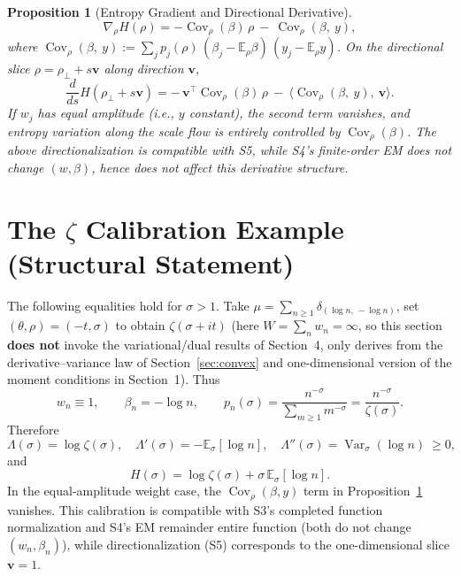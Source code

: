 \documentclass[11pt,a4paper]{article}
\newtheorem{proposition}[theorem]{Proposition}
\theoremstyle{remark}
\DeclareMathOperator{\Var}{Var}
\DeclareMathOperator{\Cov}{Cov}
\begin{document}
\begin{proposition}[Entropy Gradient and Directional Derivative]\label{prop:entropy_grad}
\begin{equation}
\nabla_\rho H(\rho)= -\Cov_\rho(\beta)\,\rho\ -\ \Cov_\rho(\beta,\ y),
\end{equation}
where $\Cov_\rho(\beta,\ y):=\sum_j p_j(\rho)\,(\beta_j-\mathbb{E}_\rho\beta)\,(y_j-\mathbb{E}_\rho y)$. On the directional slice $\rho=\rho_\perp+s\mathbf{v}$ along direction $\mathbf{v}$,
\begin{equation}
\frac{d}{ds}H(\rho_\perp+s\mathbf{v})= -\,\mathbf{v}^\top\Cov_\rho(\beta)\,\rho\ -\ \big\langle \Cov_\rho(\beta,\ y),\ \mathbf{v}\big\rangle.
\end{equation}
If $w_j$ has equal amplitude (i.e., $y$ constant), the second term vanishes, and entropy variation along the scale flow is entirely controlled by $\Cov_\rho(\beta)$. The above directionalization is compatible with S5, while S4's finite-order EM does not change $(w,\beta)$, hence does not affect this derivative structure.
\end{proposition}

\section{The $\zeta$ Calibration Example (Structural Statement)}

The following equalities hold for $\sigma>1$. Take $\mu=\sum_{n\ge 1}\delta_{(\log n,\,-\log n)}$, set $(\theta,\rho)=(-t,\sigma)$ to obtain $\zeta(\sigma+it)$ (here $W=\sum_n w_n=\infty$, so this section \textbf{does not} invoke the variational/dual results of Section~4, only derives from the derivative--variance law of Section~\ref{sec:convex} and one-dimensional version of the moment conditions in Section~1). Thus
\begin{equation}
w_n\equiv 1,\qquad \beta_n=-\log n,\qquad
p_n(\sigma)=\frac{n^{-\sigma}}{\sum_{m\ge 1} m^{-\sigma}}=\frac{n^{-\sigma}}{\zeta(\sigma)}.
\end{equation}
Therefore
\begin{equation}
\Lambda(\sigma)=\log\zeta(\sigma),\quad
\Lambda'(\sigma)=-\mathbb{E}_\sigma[\log n],\quad
\Lambda''(\sigma)=\Var_\sigma(\log n)\ \ge 0,
\end{equation}
and
\begin{equation}
H(\sigma)=\log\zeta(\sigma)+\sigma\,\mathbb{E}_\sigma[\log n].
\end{equation}
In the equal-amplitude weight case, the $\Cov_\rho(\beta,y)$ term in Proposition~\ref{prop:entropy_grad} vanishes. This calibration is compatible with S3's completed function normalization and S4's EM remainder entire function (both do not change $(w_n,\beta_n)$), while directionalization (S5) corresponds to the one-dimensional slice $\mathbf{v}=1$.
\end{document}
